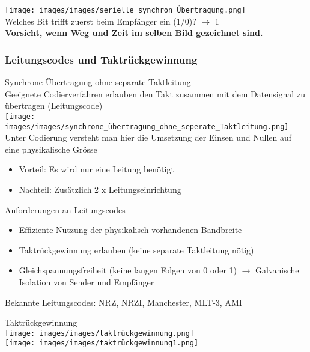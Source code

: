 \begin{example}
    \texttt{[image: images/images/serielle\_synchron\_Übertragung.png]}\\
    Welches Bit trifft zuerst beim Empfänger ein (1/0)? $\rightarrow$ 1\\
    \textbf{Vorsicht, wenn Weg und Zeit im selben Bild gezeichnet sind.}
\end{example}

\subsubsection{Leitungscodes und Taktrückgewinnung}

\begin{definition}{Synchrone Übertragung ohne separate Taktleitung}\\
    Geeignete Codierverfahren erlauben den Takt zusammen mit dem Datensignal zu übertragen (Leitungscode)\\
    \texttt{[image: images/images/synchrone\_übertragung\_ohne\_seperate\_Taktleitung.png]}\\
    Unter Codierung versteht man hier die Umsetzung der Einsen und Nullen auf eine physikalische Grösse
    \begin{itemize}
        \item Vorteil: Es wird nur eine Leitung benötigt
        \item Nachteil: Zusätzlich 2 x Leitungseinrichtung
    \end{itemize}
\end{definition}

\begin{KR}{Anforderungen an Leitungscodes}
\begin{itemize}
    \item Effiziente Nutzung der physikalisch vorhandenen Bandbreite
    \item Taktrückgewinnung erlauben (keine separate Taktleitung nötig)
    \item Gleichspannungsfreiheit (keine langen Folgen von 0 oder 1) $\rightarrow$ Galvanische Isolation von Sender und Empfänger
\end{itemize} 
\end{KR}

\begin{remark}
    Bekannte Leitungscodes: NRZ, NRZI, Manchester, MLT-3, AMI
\end{remark}

\begin{concept}{Taktrückgewinnung}\\
    \texttt{[image: images/images/taktrückgewinnung.png]}\\
    \texttt{[image: images/images/taktrückgewinnung1.png]}
\end{concept}




